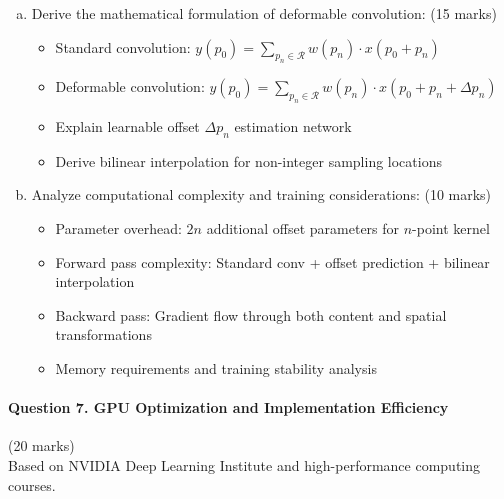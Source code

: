 \documentclass[12pt]{article}
\newcommand{\mediumanswer}{\vspace{3cm}}
\newcommand{\journalspace}{\vspace{4.5cm}}
\begin{document}
\begin{enumerate}[(a)]
    \item Derive the mathematical formulation of deformable convolution: \hfill (15 marks)
    \begin{itemize}
        \item Standard convolution: $y(p_0) = \sum_{p_n \in \mathcal{R}} w(p_n) \cdot x(p_0 + p_n)$
        \item Deformable convolution: $y(p_0) = \sum_{p_n \in \mathcal{R}} w(p_n) \cdot x(p_0 + p_n + \Delta p_n)$
        \item Explain learnable offset $\Delta p_n$ estimation network
        \item Derive bilinear interpolation for non-integer sampling locations
    \end{itemize}
    
    \journalspace
    
    \item Analyze computational complexity and training considerations: \hfill (10 marks)
    \begin{itemize}
        \item Parameter overhead: $2n$ additional offset parameters for $n$-point kernel
        \item Forward pass complexity: Standard conv + offset prediction + bilinear interpolation
        \item Backward pass: Gradient flow through both content and spatial transformations
        \item Memory requirements and training stability analysis
    \end{itemize}
    
    \mediumanswer
\end{enumerate}

\newpage
\paragraph{Question 7. GPU Optimization and Implementation Efficiency}{{\hfill (20 marks)}}\\
Based on NVIDIA Deep Learning Institute and high-performance computing courses.
\end{document}
